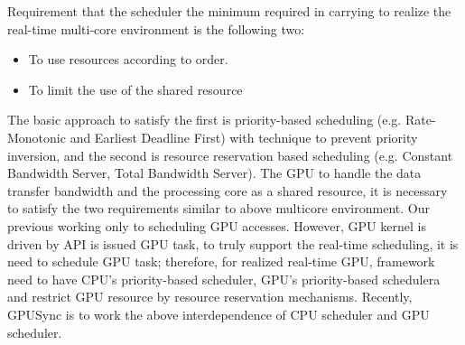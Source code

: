 Requirement that the scheduler the minimum required in carrying to realize the real-time multi-core environment is the following two:
\begin{itemize}
\item To use resources according to order.
\item To limit the use of the shared resource
\end{itemize}
The basic approach to satisfy the first is priority-based scheduling (e.g. Rate-Monotonic\cite{sched:rm} and Earliest Deadline First\cite{sched:edf}) with technique to prevent priority inversion,
and the second is resource reservation based scheduling (e.g. Constant Bandwidth Server\cite{rr:cbs}, Total Bandwidth Server\cite{rr:tbs2}).
The GPU to handle the data transfer bandwidth and the processing core as a shared resource,
it is necessary to satisfy the two requirements similar to above multicore environment.
Our previous working only to scheduling GPU accesses.
However, GPU kernel is driven by API is issued GPU task, to truly support  the real-time scheduling, it is need to schedule GPU task; therefore, for realized real-time GPU, framework need to have CPU's priority-based scheduler, GPU's priority-based schedulera and restrict GPU resource by resource reservation mechanisms.
Recently, GPUSync is to work the above interdependence of CPU scheduler and GPU scheduler.

